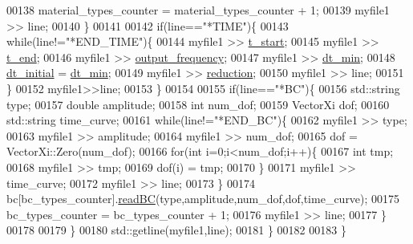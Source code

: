 \begin{DoxyCode}
00138             material\_types\_counter = material\_types\_counter + 1;
00139             myfile1 >> line;
00140         \}
00141 
00142         \textcolor{keywordflow}{if}(line==\textcolor{stringliteral}{"*TIME"})\{
00143           \textcolor{keywordflow}{while}(line!=\textcolor{stringliteral}{"*END\_TIME"})\{
00144             myfile1 >> \hyperlink{fe__main_read_8cpp_a1b01a4354147da92a548ea1a5f96d592}{t\_start};
00145             myfile1 >> \hyperlink{fe__main_read_8cpp_a4b637c5fff609e604a3b2b2787f4a9fa}{t\_end};
00146             myfile1 >> \hyperlink{fe__main_read_8cpp_ace6ace9b2f6d8d404ca9e66564289eb1}{output\_frequency};
00147             myfile1 >> \hyperlink{fe__main_read_8cpp_a0a612324885914b6799185d54c48b310}{dt\_min};
00148             \hyperlink{fe__main_read_8cpp_a068c627ac33cf3c721d8f28eab205a83}{dt\_initial} = \hyperlink{fe__main_read_8cpp_a0a612324885914b6799185d54c48b310}{dt\_min};
00149             myfile1 >> \hyperlink{fe__main_read_8cpp_a7700f3aeb1ca1c9bbbf712dbfb0aa349}{reduction};
00150             myfile1 >> line;
00151           \}
00152           myfile1>>line;
00153         \}
00154 
00155         \textcolor{keywordflow}{if}(line==\textcolor{stringliteral}{"*BC"})\{
00156           std::string type;
00157           \textcolor{keywordtype}{double} amplitude;
00158           \textcolor{keywordtype}{int} num\_dof;
00159           VectorXi dof;
00160           std::string time\_curve;
00161           \textcolor{keywordflow}{while}(line!=\textcolor{stringliteral}{"*END\_BC"})\{
00162             myfile1 >> type;
00163             myfile1 >> amplitude;
00164             myfile1 >> num\_dof;
00165             dof = VectorXi::Zero(num\_dof);
00166             \textcolor{keywordflow}{for}(\textcolor{keywordtype}{int} i=0;i<num\_dof;i++)\{
00167               \textcolor{keywordtype}{int} tmp;
00168               myfile1 >> tmp;
00169               dof(i) = tmp;
00170             \}
00171             myfile1 >> time\_curve;
00172             myfile1 >> line;
00173           \}
00174           bc[bc\_types\_counter].\hyperlink{class_b_c_a8ceaa781f98b4128fa50611ff9481e1a}{readBC}(type,amplitude,num\_dof,dof,time\_curve);
00175           bc\_types\_counter = bc\_types\_counter + 1;
00176           myfile1 >> line;
00177         \}
00178 
00179     \}
00180     std::getline(myfile1,line);
00181   \}
00182 
00183 \}
\end{DoxyCode}
